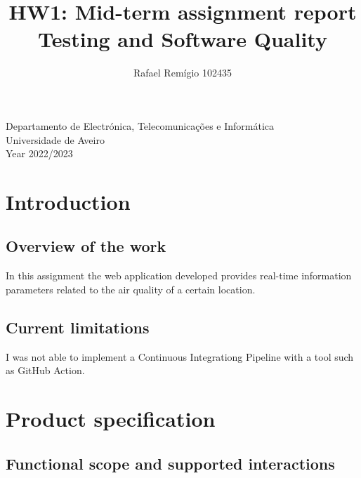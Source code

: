 \documentclass[12pt]{article}
\begin{document}
\begin{titlepage}

\title{%
  HW1: Mid-term assignment report\\
  \large  Testing and Software Quality\\}

\author{Rafael Remígio 102435}

\maketitle

\vfill
\begin{center}

	Departamento de Electrónica, Telecomunicações e Informática\\
       Universidade de Aveiro\\ Year 2022/2023
\end{center}



\end{titlepage}

\tableofcontents


\section{Introduction}

\subsection{Overview of the work} 

In this assignment the web application developed provides real-time information parameters related to the air quality of a certain location.

\subsection{Current limitations} 

I was not able to implement a Continuous Integrationg Pipeline with a tool such as GitHub Action.

\section{Product specification}


\subsection{Functional scope and supported interactions }
\end{document}

